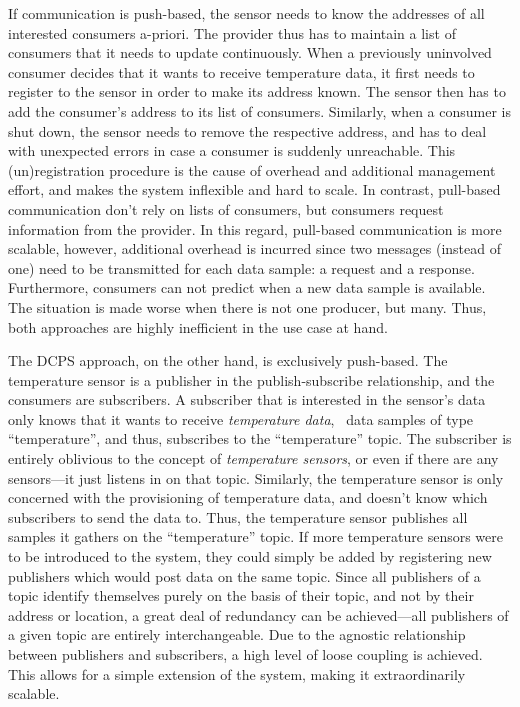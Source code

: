 If communication is push-based, the sensor needs to know the addresses of all interested consumers a-priori. The provider thus has to maintain a list of consumers that it needs to update continuously. When a previously uninvolved consumer decides that it wants to receive temperature data, it first needs to register to the sensor in order to make its address known. The sensor then has to add the consumer's address to its list of consumers. Similarly, when a consumer is shut down, the sensor needs to remove the respective address, and has to deal with unexpected errors in case a consumer is suddenly unreachable. This (un)registration procedure is the cause of overhead and additional management effort, and makes the system inflexible and hard to scale. In contrast, pull-based communication don't rely on lists of consumers, but consumers request information from the provider. In this regard, pull-based communication is more scalable, however, additional overhead is incurred since two messages (instead of one) need to be transmitted for each data sample: a request and a response. Furthermore, consumers can not predict when a new data sample is available. The situation is made worse when there is not one producer, but many. Thus, both approaches are highly inefficient in the use case at hand.

The DCPS approach, on the other hand, is exclusively push-based. The temperature sensor is a publisher in the publish-subscribe relationship, and the consumers are subscribers. A subscriber that is interested in the sensor's data only knows that it wants to receive \emph{temperature data}, \ie\ data samples of type ``temperature'', and thus, subscribes to the ``temperature'' topic. The subscriber is entirely oblivious to the concept of \emph{temperature sensors}, or even if there are any sensors---it just listens in on that topic. Similarly, the temperature sensor is only concerned with the provisioning of temperature data, and doesn't know which subscribers to send the data to. Thus, the temperature sensor publishes all samples it gathers on the ``temperature'' topic. If more temperature sensors were to be introduced to the system, they could simply be added by registering new publishers which would post data on the same topic. Since all publishers of a topic identify themselves purely on the basis of their topic, and not by their address or location, a great deal of redundancy can be achieved---all publishers of a given topic are entirely interchangeable. 
Due to the agnostic relationship between publishers and subscribers, a high level of loose coupling is achieved. This allows for a simple extension of the system, making it extraordinarily scalable. 

